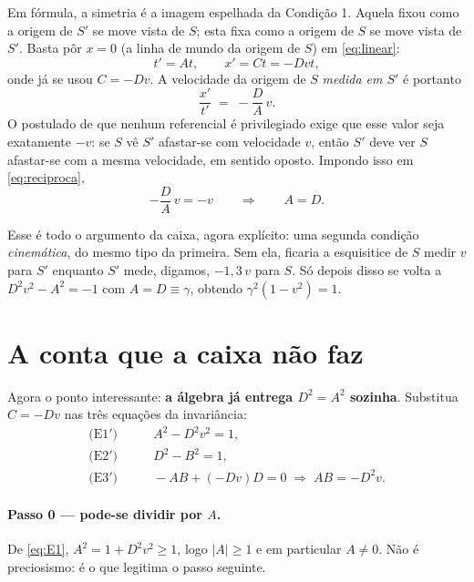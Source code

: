 \documentclass[12pt,a4paper,oneside]{book}
\begin{document}
Em fórmula, a simetria é a imagem espelhada da Condição 1. Aquela fixou como
a origem de $S'$ se move vista de $S$; esta fixa como a origem de $S$ se move
vista de $S'$. Basta pôr $x=0$ (a linha de mundo da origem de $S$) em
\eqref{eq:linear}:
\begin{equation}
  t' = At, \qquad x' = Ct = -Dvt,
\end{equation}
onde já se usou $C=-Dv$. A velocidade da origem de $S$ \emph{medida em $S'$}
é portanto
\begin{equation}
  \frac{x'}{t'} \;=\; -\frac{D}{A}\,v .
  \label{eq:reciproca}
\end{equation}
O postulado de que nenhum referencial é privilegiado exige que esse valor
seja exatamente $-v$: se $S$ vê $S'$ afastar-se com velocidade $v$, então
$S'$ deve ver $S$ afastar-se com a mesma velocidade, em sentido oposto.
Impondo isso em \eqref{eq:reciproca},
\begin{equation}
  -\frac{D}{A}\,v = -v \qquad\Longrightarrow\qquad A=D .
\end{equation}

\noindent
Esse é todo o argumento da caixa, agora explícito: uma segunda condição
\emph{cinemática}, do mesmo tipo da primeira. Sem ela, ficaria a esquisitice
de $S$ medir $v$ para $S'$ enquanto $S'$ mede, digamos, $-1{,}3\,v$ para $S$.
Só depois disso se volta a $D^2v^2-A^2=-1$ com $A=D\equiv\gamma$, obtendo
$\gamma^2(1-v^2)=1$.

\section{A conta que a caixa não faz}

Agora o ponto interessante: \textbf{a álgebra já entrega $D^2=A^2$ sozinha}.
Substitua $C=-Dv$ nas três equações da invariância:
\begin{align}
  \text{(E1$'$)}&\qquad A^2 - D^2v^2 = 1, \label{eq:E1}\\
  \text{(E2$'$)}&\qquad D^2 - B^2 = 1,    \label{eq:E2}\\
  \text{(E3$'$)}&\qquad -AB + (-Dv)D = 0 \;\Longrightarrow\; AB = -D^2v.
  \label{eq:E3}
\end{align}

\paragraph{Passo 0 --- pode-se dividir por $A$.}
De \eqref{eq:E1}, $A^2 = 1 + D^2v^2 \ge 1$, logo $|A|\ge 1$ e em particular
$A\neq 0$. Não é preciosismo: é o que legitima o passo seguinte.
\end{document}
